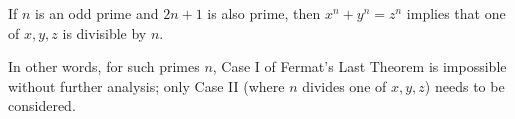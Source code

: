 If $n$ is an odd prime and $2n+1$ is also prime, then $x^n + y^n = z^n$ implies that one of $x, y, z$ is divisible by $n$.

In other words, for such primes $n$, Case I of Fermat's Last Theorem is impossible without further analysis; only Case II (where $n$ divides one of $x, y, z$) needs to be considered.

